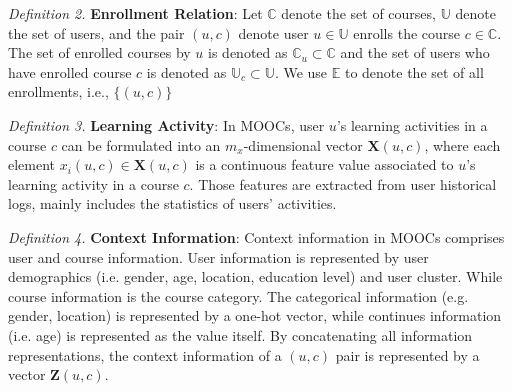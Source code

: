 \emph{Definition 2.} \textbf{Enrollment Relation}: Let $\mathbb{C}$ denote the set of courses, $\mathbb{U}$ denote the set of users, and the pair $(u,c)$ denote user $u\in \mathbb{U}$ enrolls the course $c\in \mathbb{C}$.
The set of enrolled courses by $u$ is denoted as  $\mathbb{C}_u\subset \mathbb{C}$ and 
the set of users who have enrolled course $c$ is denoted as $\mathbb{U}_c\subset \mathbb{U}$.
We use $\mathbb{E}$ to denote the set of all enrollments, i.e., $\{(u,c)\}$

\emph{Definition 3.} \textbf{Learning Activity}: 
In MOOCs, user $u$'s learning activities in a course $c$ can be formulated into an $m_x$-dimensional vector $\mathbf{X}(u,c)$, where each element $x_i(u,c) \in \mathbf{X}(u,c)$ is a continuous feature value associated to $u$'s learning activity in a course $c$. Those features are extracted from user historical logs, mainly includes the statistics of users' activities.

\emph{Definition 4.} \textbf{Context Information}: Context information in MOOCs comprises user and course information. User information is represented by user demographics (i.e. gender, age, location, education level) and user cluster. While course information is the course category. The categorical information (e.g. gender, location) is represented by a one-hot vector, while continues information (i.e. age) is represented as the value itself. By concatenating all information representations, the context information of a $(u,c)$ pair is represented by a vector $\mathbf{Z}(u,c)$.   




